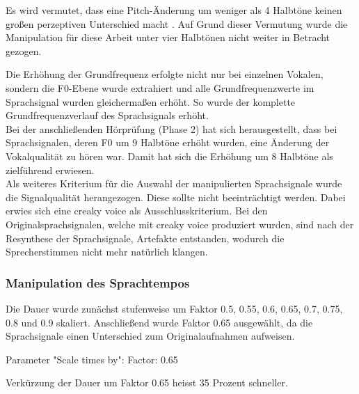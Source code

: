 \documentclass[11pt,a4paper,headsepline,twoside,toc=bibliography]{scrreprt}
\begin{document}
Es wird vermutet, dass eine Pitch-Änderung um weniger als 4 Halbtöne keinen großen perzeptiven Unterschied macht \autocite{Ye2020}. Auf Grund dieser Vermutung wurde die Manipulation für diese Arbeit unter vier Halbtönen nicht weiter in Betracht gezogen. \\






Die Erhöhung der Grundfrequenz erfolgte nicht nur bei einzelnen Vokalen, sondern die F0-Ebene wurde extrahiert und alle Grundfrequenzwerte im Sprachsignal wurden gleichermaßen erhöht. So wurde der komplette Grundfrequenzverlauf des Sprachsignals erhöht.\\


Bei der anschließenden Hörprüfung (Phase 2) hat sich herausgestellt, dass bei Sprachsignalen, deren F0 um 9 Halbtöne erhöht wurden, eine Änderung der Vokalqualität zu hören war. Damit hat sich die Erhöhung um 8 Halbtöne als zielführend erwiesen.\\

Als weiteres Kriterium für die Auswahl der manipulierten Sprachsignale wurde die Signalqualität herangezogen. Diese sollte nicht beeinträchtigt werden. Dabei erwies sich eine creaky voice als Ausschlusskriterium. Bei den Originalsprachsignalen, welche mit creaky voice produziert wurden, sind nach der Resynthese der Sprachsignale, Artefakte entstanden, wodurch die Sprecherstimmen nicht mehr natürlich klangen.

\subsubsection{Manipulation des Sprachtempos}
\label{sec:tempo}

Die Dauer wurde zunächst stufenweise um Faktor 0.5, 0.55, 0.6, 0.65, 0.7, 0.75, 0.8 und 0.9 skaliert. Anschließend wurde Faktor 0.65 ausgewählt, da die Sprachsignale einen Unterschied zum Originalaufnahmen aufweisen.

Parameter "Scale times by":
Factor: 0.65

Verkürzung der Dauer um Faktor 0.65 heisst 35 Prozent schneller.
\end{document}
